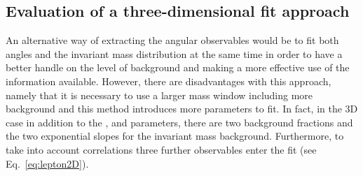 %
%



\subsection{Evaluation of a three-dimensional fit approach}

An alternative way of extracting the angular observables would be to fit both angles 
and the invariant mass distribution at the same time in order to have a better handle on the level of background and making 
a more effective use  of the information available. However, there are disadvantages with this approach, namely that
it is necessary to use a larger mass window including more background and this method introduces more parameters to fit.
In fact, in the 3D case in addition to the \afbl, \fl and \afbh parameters, there are
two background fractions and the two exponential slopes for the invariant mass background.
Furthermore, to take into account correlations three further observables enter the fit (see Eq.~\ref{eq:lepton2D}). 


